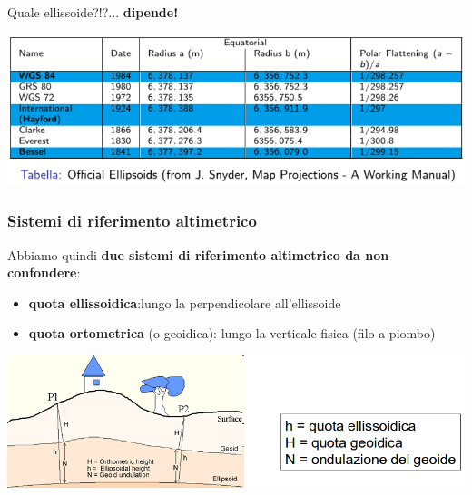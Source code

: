 \documentclass{beamer}
\begin{document}
{\begin{frame}
    Quale ellissoide?!?... \textbf{dipende!}
    
    \begin{center}
        \includegraphics[height=.35\textheight]{./pics_2022_03/ellissoidi.png}	
    \end{center} 

\end{frame}

\begin{frame}
   \frametitle{Sistemi di riferimento altimetrico}
        Abbiamo quindi \textbf{due sistemi di riferimento altimetrico da non confondere}:
   \begin{itemize}
   		\item \textbf{quota ellissoidica}:lungo la perpendicolare all'ellissoide
		\item \textbf{quota ortometrica} (o geoidica): lungo la verticale fisica (filo a piombo)
   \end{itemize}
   \begin{center}
    	\includegraphics[width=1\textwidth] {./pics/altezze.png}
   \end{center}
\end{frame}

}
\end{document}
